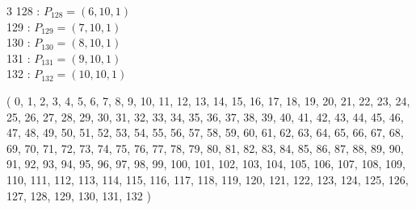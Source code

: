\documentclass{article}
\begin{document}
{\begin{multicols}{3}
128 : $P_{128}=( 6, 10, 1 )$\\
129 : $P_{129}=( 7, 10, 1 )$\\
130 : $P_{130}=( 8, 10, 1 )$\\
131 : $P_{131}=( 9, 10, 1 )$\\
132 : $P_{132}=( 10, 10, 1 )$\\
\end{multicols}
( 0, 1, 2, 3, 4, 5, 6, 7, 8, 9, 10, 11, 12, 13, 14, 15, 16, 17, 18, 19, 20, 21, 22, 23, 24, 25, 26, 27, 28, 29, 30, 31, 32, 33, 34, 35, 36, 37, 38, 39, 40, 41, 42, 43, 44, 45, 46, 47, 48, 49, 50, 51, 52, 53, 54, 55, 56, 57, 58, 59, 60, 61, 62, 63, 64, 65, 66, 67, 68, 69, 70, 71, 72, 73, 74, 75, 76, 77, 78, 79, 80, 81, 82, 83, 84, 85, 86, 87, 88, 89, 90, 91, 92, 93, 94, 95, 96, 97, 98, 99, 100, 101, 102, 103, 104, 105, 106, 107, 108, 109, 110, 111, 112, 113, 114, 115, 116, 117, 118, 119, 120, 121, 122, 123, 124, 125, 126, 127, 128, 129, 130, 131, 132 )\\
}
\end{document}
